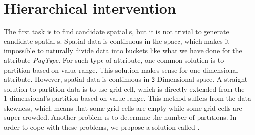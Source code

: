 







\section{Hierarchical intervention}
\label{sec:hei_intervention}

The first task is to find candidate spatial {\explanation}s, but
it is not trivial to generate candidate spatial {\explanation}s. 
Spatial data is continuous in the space, which makes it impossible to naturally divide data into buckets like what we have done for the attribute \emph{PayType}. 
For such type of attribute, one common solution is to partition based on value range. 
This solution makes sense for one-dimensional attribute. 
However, spatial data is continuous in 2-Dimensional space. 
A straight solution to partition data is to use grid cell, which is directly extended from the 1-dimensional's partition based on value range. 
This method suffers from the data skewness, which means that some grid cells are empty while some grid cells are super crowded. 
Another problem is to determine the number of partitions. 
In order to cope with these problems, we propose a solution called {\solution}. 


